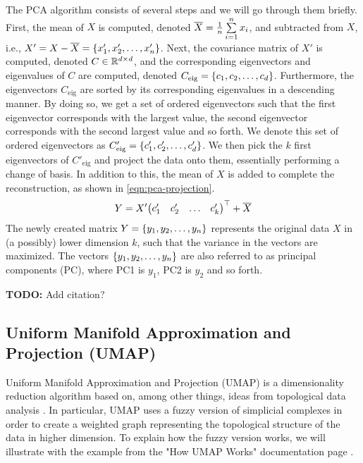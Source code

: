 The PCA algorithm consists of several steps and we will go through them briefly. First, the mean of $X$ is computed, denoted $\overline{X} = \frac{1}{n} \sum\limits_{i=1}^{n} x_i$, and subtracted from $X$, i.e., $X' = X - \overline{X} = \left\{x'_1, x'_2, \ldots, x'_n\right\}$. Next, the covariance matrix of $X'$ is computed, denoted $C \in \mathbb{R}^{d \times d}$, and the corresponding eigenvectors and eigenvalues of $C$ are computed, denoted $C_\text{eig} = \left\{c_1, c_2, \ldots, c_d\right\}$. Furthermore, the eigenvectors $C_\text{eig}$ are sorted by its corresponding eigenvalues in a descending manner. By doing so, we get a set of ordered eigenvectors such that the first eigenvector corresponds with the largest value, the second eigenvector corresponds with the second largest value and so forth. We denote this set of ordered eigenvectors as $C'_\text{eig} = \left\{c'_1, c'_2, \ldots, c'_d\right\}$. We then pick the $k$ first eigenvectors of $C'_\text{eig}$ and project the data onto them, essentially performing a change of basis. In addition to this, the mean of $X$ is added to complete the reconstruction, as shown in \cref{eqn:pca-projection}.
\begin{align}
    \label{eqn:pca-projection}
    Y = X' {\begin{pmatrix}
    c'_1 & c'_2 & \ldots & c'_k
    \end{pmatrix}}^\top + \overline{X}
\end{align}
The newly created matrix $Y = \left\{y_1, y_2, \ldots, y_n\right\}$ represents the original data $X$ in (a possibly) lower dimension $k$, such that the variance in the vectors are maximized. The vectors $\left\{y_1, y_2, \ldots, y_n\right\}$ are also referred to as principal components (PC), where PC1 is $y_1$, PC2 is $y_2$ and so forth.

\textbf{TODO:} Add citation?

\subsection{Uniform Manifold Approximation and Projection (UMAP)}
Uniform Manifold Approximation and Projection (UMAP) is a dimensionality reduction algorithm based on, among other things, ideas from topological data analysis \cite{2018arXivUMAP}. In particular, UMAP uses a fuzzy version of simplicial complexes in order to create a weighted graph representing the topological structure of the data in higher dimension. To explain how the fuzzy version works, we will illustrate with the example from the "How UMAP Works" documentation page \cite{how-umap-works-2018}.

